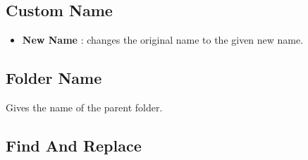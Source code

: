 \documentclass[10pt, a4paper]{scrartcl}
\begin{document}
\subsection*{Custom Name}
\begin{itemize}
        \item \textbf{New Name} : changes the original name to the given new name.
\end{itemize}

\subsection*{Folder Name}
Gives the name of the parent folder.

\subsection*{Find And Replace}
\end{document}
